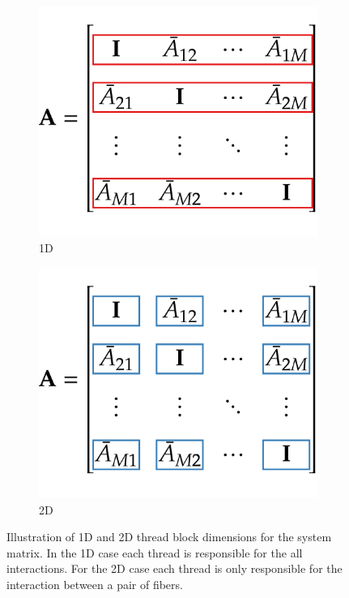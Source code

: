 \begin{figure}[!htbp]
  \centering
  \begin{subfigure}[h]{0.33\textwidth}
    \centering
    \includegraphics[width=\textwidth]{img/thread_block1D.pdf}
    \caption{1D}\label{fig:thread_block_1D}
  \end{subfigure}
  \begin{subfigure}[h]{0.33\textwidth}
    \centering
    \includegraphics[width=\textwidth]{img/thread_block2D.pdf}
    \caption{2D}\label{fig:thread_block_2D}
  \end{subfigure}
  \caption[Illustration of 1D and 2D thread block dimensions for the system matrix.]{Illustration of 1D and 2D thread block dimensions for the system matrix. In the 1D case each thread is responsible for the all interactions. For the 2D case each thread is only responsible for the interaction between a pair of fibers.}
  \label{fig:thread_block}
\end{figure}

